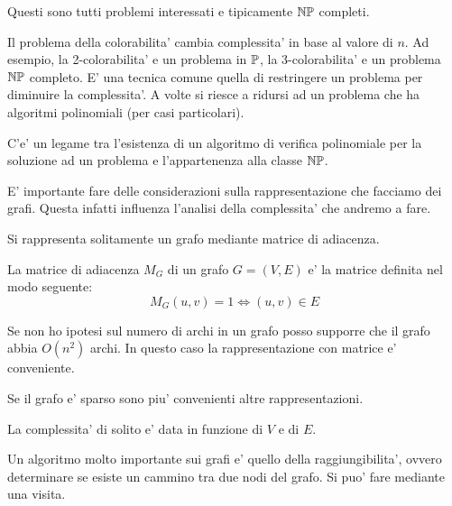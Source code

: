 Questi sono tutti problemi interessati e tipicamente $\mathbb{NP}$ completi.

Il problema della colorabilita' cambia complessita' in base al valore di $n$. Ad esempio, la
2-colorabilita' e un problema in $\mathbb{P}$, la 3-colorabilita' e un problema $\mathbb{NP}$ completo. E'
una tecnica comune quella di restringere un problema per diminuire la complessita'. A volte si
riesce a ridursi ad un problema che ha algoritmi polinomiali (per casi particolari).

C'e' un legame tra l'esistenza di un algoritmo di verifica polinomiale per la soluzione ad un
problema e l'appartenenza alla classe $\mathbb{NP}$.

E' importante fare delle considerazioni sulla rappresentazione che facciamo dei grafi. Questa
infatti influenza l'analisi della complessita' che andremo a fare.

Si rappresenta solitamente un grafo mediante matrice di adiacenza.

\begin{defn}
    La matrice di adiacenza $M_{G}$ di un grafo $G = (V,E)$ e' la matrice definita nel modo
    seguente:
    \begin{equation*}
        M_{G}(u,v) = 1 \iff (u,v) \in E
    \end{equation*}
\end{defn}

Se non ho ipotesi sul numero di archi in un grafo posso supporre che il grafo abbia $O(n^{2})$ archi.
In questo caso la rappresentazione con matrice e' conveniente.

Se il grafo e' sparso sono piu' convenienti altre rappresentazioni.

La complessita' di solito e' data in funzione di $V$ e di $E$.

Un algoritmo molto importante sui grafi e' quello della raggiungibilita', ovvero determinare se
esiste un cammino tra due nodi del grafo. Si puo' fare mediante una visita.

